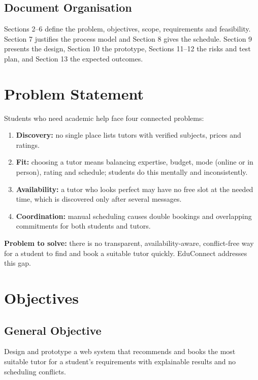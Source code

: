 \documentclass[11pt,a4paper]{article}
\begin{document}
\subsection{Document Organisation}
Sections 2--6 define the problem, objectives, scope, requirements and feasibility. Section 7 justifies the process model and Section 8 gives the schedule. Section 9 presents the design, Section 10 the prototype, Sections 11--12 the risks and test plan, and Section 13 the expected outcomes.

\section{Problem Statement}
Students who need academic help face four connected problems:
\begin{enumerate}
  \item \textbf{Discovery:} no single place lists tutors with verified subjects, prices and ratings.
  \item \textbf{Fit:} choosing a tutor means balancing expertise, budget, mode (online or in person), rating and schedule; students do this mentally and inconsistently.
  \item \textbf{Availability:} a tutor who looks perfect may have no free slot at the needed time, which is discovered only after several messages.
  \item \textbf{Coordination:} manual scheduling causes double bookings and overlapping commitments for both students and tutors.
\end{enumerate}
\textbf{Problem to solve:} there is no transparent, availability-aware, conflict-free way for a student to find and book a suitable tutor quickly. EduConnect addresses this gap.

\section{Objectives}
\subsection{General Objective}
Design and prototype a web system that recommends and books the most suitable tutor for a student's requirements with explainable results and no scheduling conflicts.
\end{document}
